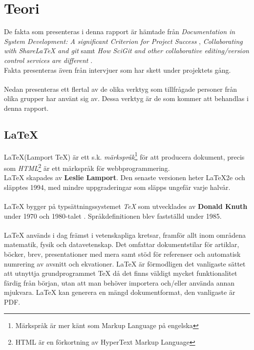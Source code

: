 
\chapter{Teori}
\label{cha:theory}
De fakta som presenteras i denna rapport är hämtade från \textit{Documentation in System Development: A significant Criterion for Project Success} \cite{docsystemdev}, \textit{Collaborating with ShareLaTeX and git} \cite{website:sharelatex_with_git} samt \textit{How SciGit and other collaborative editing/version control services are different} \cite{website:scigit_blog}. \\
Fakta presenteras även från intervjuer som har skett under projektets gång.
\\ \\
Nedan presenteras ett flertal av de olika verktyg som tillfrågade personer från olika grupper har använt sig av. Dessa verktyg är de som kommer att behandlas i denna rapport.

\section{LaTeX}
\LaTeX (Lamport TeX) är ett s.k. \textit{märkspråk}\footnote{Märkspråk är mer känt som Markup Language på engelska} för att producera dokument, precis som \textit{HTML}\footnote{HTML är en förkortning av HyperText Markup Language} är ett märkspråk för webbprogrammering. \\
LaTeX skapades av \textbf{Leslie Lamport}. Den senaste versionen heter LaTeX2e och släpptes 1994, med mindre uppgraderingar som släpps ungefär varje halvår.
\\ \\
LaTeX bygger på typsättningssystemet \textit{TeX} som utvecklades av \textbf{Donald Knuth} under 1970 och 1980-talet \cite{the_tex_book}. Språkdefinitionen blev fastställd under 1985.
\\ \\
LaTeX används i dag främst i vetenskapliga kretsar, framför allt inom områdena matematik, fysik och datavetenskap. Det omfattar dokumentstilar för artiklar, böcker, brev, presentationer med mera samt stöd för referenser och automatisk numrering av avsnitt och ekvationer. LaTeX är förmodligen det vanligaste sättet att utnyttja grundprogrammet TeX då det finns väldigt mycket funktionalitet färdig från början, utan att man behöver importera och/eller använda annan mjukvara. LaTeX kan generera en mängd dokumentformat, den vanligaste är PDF.

